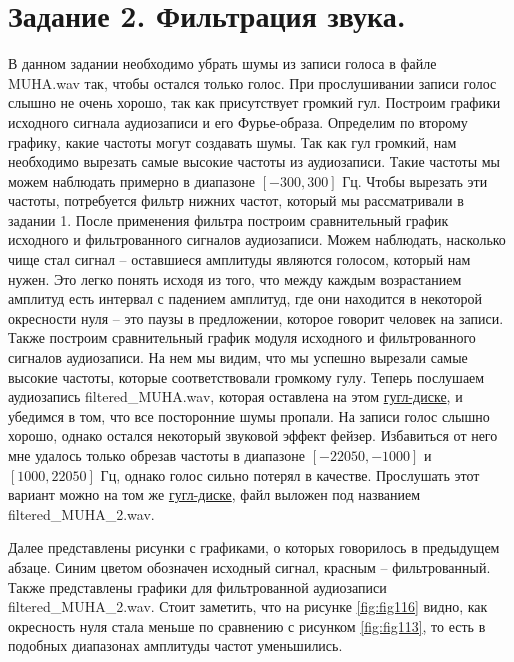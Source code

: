 \documentclass[a4paper, 12pt]{article}
\begin{document}
    \section{Задание 2. Фильтрация звука.}
    В данном задании необходимо убрать шумы из записи голоса в файле MUHA.wav так, чтобы остался только голос. 
    При прослушивании записи голос слышно не очень хорошо, так как присутствует громкий гул. Построим графики
    исходного сигнала аудиозаписи и его Фурье-образа. Определим по второму графику, какие частоты могут создавать
    шумы. Так как гул громкий, нам необходимо вырезать самые высокие частоты из аудиозаписи. Такие частоты мы можем
    наблюдать примерно в диапазоне $[-300,300]$ Гц. Чтобы вырезать эти частоты, потребуется фильтр нижних частот, который
    мы рассматривали в задании 1. После применения фильтра построим сравнительный график исходного и фильтрованного
    сигналов аудиозаписи. Можем наблюдать, насколько чище стал сигнал -- оставшиеся амплитуды являются голосом, который 
    нам нужен. Это легко понять исходя из того, что между каждым возрастанием амплитуд есть интервал с падением амплитуд, 
    где они находится в некоторой окресности нуля -- это паузы в предложении, которое говорит человек на записи. Также построим
    сравнительный график модуля исходного и фильтрованного сигналов аудиозаписи. На нем мы видим, что мы успешно вырезали
    самые высокие частоты, которые соответствовали громкому гулу. Теперь послушаем аудиозапись filtered\_{MUHA}.wav, которая 
    оставлена на этом \href{https://drive.google.com/drive/folders/1AuXIiKRWvXFOtJqV3uqPzC494zZ7vCrd?usp=sharing}{гугл-диске}, 
    и убедимся в том, что все посторонние шумы пропали. На записи голос слышно хорошо, однако остался некоторый звуковой эффект 
    фейзер. Избавиться от него мне удалось только обрезав частоты в диапазоне $[-22050, -1000]$ и $[1000, 22050]$ Гц, однако
    голос сильно потерял в качестве. Прослушать этот вариант можно на том же \href{https://drive.google.com/drive/folders/1AuXIiKRWvXFOtJqV3uqPzC494zZ7vCrd?usp=sharing}{гугл-диске},
    файл выложен под названием filtered\_{MUHA}\_{2}.wav.


    Далее представлены рисунки с графиками, о которых говорилось в предыдущем абзаце. Синим цветом обозначен исходный сигнал,
    красным -- фильтрованный. Также представлены графики для фильтрованной аудиозаписи filtered\_{MUHA}\_{2}.wav. Стоит заметить,
    что на рисунке \ref{fig:fig116} видно, как окресность нуля стала меньше по сравнению с рисунком \ref{fig:fig113}, то есть в 
    подобных диапазонах амплитуды частот уменьшились.
\end{document}
